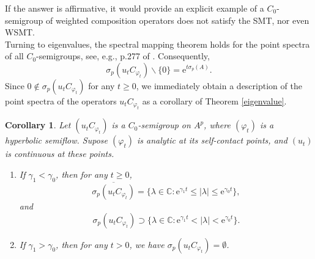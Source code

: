 \documentclass{amsart}
\theoremstyle{proclaim}
\newtheorem{corollary}[theorem]{Corollary}
\theoremstyle{fancyproclaim}
\theoremstyle{definition}
\theoremstyle{fancystatement}
\numberwithin{equation}{section}
\begin{document}
If the answer is affirmative, it would provide an explicit example of a $C_0$-semigroup of weighted composition operators does not satisfy the SMT, nor even WSMT.
\\

Turning to eigenvalues, the spectral mapping theorem holds for the point spectra of all $C_0$-semigroups, see, e.g., p.277 of \cite{equ}. Consequently,
$$\sigma_p(u_tC_{\varphi_t})\backslash\{0\} =  \mathrm{e}^{t\sigma_p(A)}.$$
Since $0\notin \sigma_p(u_tC_{\varphi_t})$ for any $t\geq0$, we immediately obtain a description of the point spectra of the operators $u_tC_{\varphi_t}$ as a corollary of Theorem \ref{eigenvalue}.

\begin{corollary}
Let $(u_tC_{\varphi_t})$ is a $C_0$-semigroup on $A^p$, where $(\varphi_t)$ is a hyperbolic semiflow. Supose $(\varphi_t)$ is analytic at its self-contact points, and $(u_t)$ is continuous at these points.
 \begin{enumerate}
\item If $\gamma_1<\gamma_0$, then for any $t\geq0$,
$$\overline{\sigma_p(u_tC_{\varphi_t})}=\{\lambda\in\mathbb{C} :  \mathrm{e}^{\gamma_1t}\leq|\lambda|\leq \mathrm{e}^{\gamma_0t}\},$$
and
$$\sigma_p(u_tC_{\varphi_t})\supset\{\lambda\in\mathbb{C} :  \mathrm{e}^{\gamma_1t}<|\lambda|<\mathrm{e}^{\gamma_0t}\}.$$

\item If $\gamma_1>\gamma_0$, then for any $t>0$, we have $\sigma_p(u_tC_{\varphi_t})=\emptyset$.
\end{enumerate}
\end{corollary}
\end{document}
